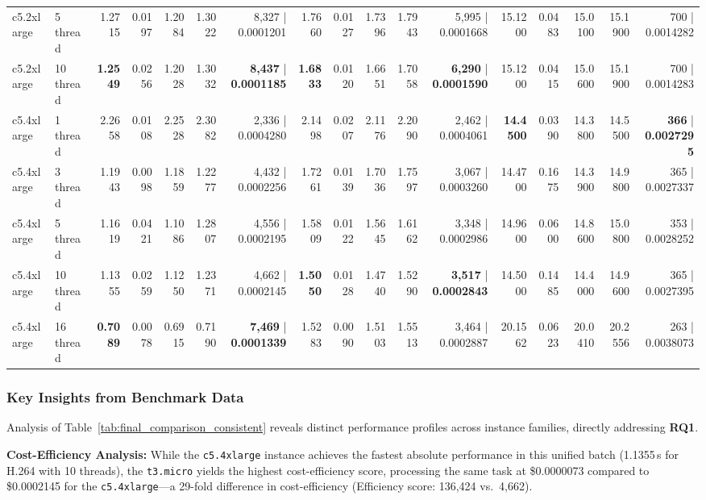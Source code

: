 \documentclass[conference]{IEEEtran}
\begin{document}
\begin{table}[h]
{\begin{tabular}{ll|rrrrr|rrrrr|rrrrr}
			c5.2xlarge & 5 thread & 1.2715 & 0.0197 & 1.2084 & 1.3022 & 8,327 | 0.0001201 & 1.7660 & 0.0127 & 1.7396 & 1.7943 & 5,995 | 0.0001668 & 15.1200 & 0.0483 & 15.0100 & 15.1900 & 700 | 0.0014282 \\
			c5.2xlarge & 10 thread & \textbf{1.2549} & 0.0256 & 1.2028 & 1.3032 & \textbf{8,437} | \textbf{0.0001185} & \textbf{1.6833} & 0.0120 & 1.6651 & 1.7058 & \textbf{6,290} | \textbf{0.0001590} & 15.1200 & 0.0415 & 15.0600 & 15.1900 & 700 | 0.0014283 \\
			\midrule
			c5.4xlarge & 1 thread & 2.2658 & 0.0108 & 2.2528 & 2.3082 & 2,336 | 0.0004280 & 2.1498 & 0.0207 & 2.1176 & 2.2090 & 2,462 | 0.0004061 & \textbf{14.4500} & 0.0390 & 14.3800 & 14.5500 & \textbf{366} | \textbf{0.0027295} \\
			c5.4xlarge & 3 thread & 1.1943 & 0.0098 & 1.1859 & 1.2277 & 4,432 | 0.0002256 & 1.7261 & 0.0139 & 1.7036 & 1.7597 & 3,067 | 0.0003260 & 14.4700 & 0.1675 & 14.3900 & 14.9800 & 365 | 0.0027337 \\
			c5.4xlarge & 5 thread & 1.1619 & 0.0421 & 1.1086 & 1.2807 & 4,556 | 0.0002195 & 1.5809 & 0.0122 & 1.5645 & 1.6162 & 3,348 | 0.0002986 & 14.9600 & 0.0600 & 14.8600 & 15.0800 & 353 | 0.0028252 \\
			c5.4xlarge & 10 thread & 1.1355 & 0.0259 & 1.1250 & 1.2371 & 4,662 | 0.0002145 & \textbf{1.5050} & 0.0128 & 1.4740 & 1.5290 & \textbf{3,517} | \textbf{0.0002843} & 14.5000 & 0.1485 & 14.4000 & 14.9600 & 365 | 0.0027395 \\
			c5.4xlarge & 16 thread & \textbf{0.7089} & 0.0078 & 0.6915 & 0.7190 & \textbf{7,469} | \textbf{0.0001339} & 1.5283 & 0.0090 & 1.5103 & 1.5513 & 3,464 | 0.0002887 & 20.1562 & 0.0623 & 20.0410 & 20.2556 & 263 | 0.0038073 \\
			\bottomrule
		\end{tabular}
	}
\end{table}

\subsubsection{Key Insights from Benchmark Data}

Analysis of Table~\ref{tab:final_comparison_consistent} reveals distinct
performance profiles across instance families, directly addressing \textbf{RQ1}.

\textbf{Cost-Efficiency Analysis:} While the \texttt{c5.4xlarge} instance
achieves the fastest absolute performance in this unified batch (1.1355\,s for H.264
with 10 threads), the \texttt{t3.micro} yields the highest cost-efficiency score,
processing the same task at \$0.0000073 compared to \$0.0002145 for the
\texttt{c5.4xlarge}---a 29-fold difference in cost-efficiency (Efficiency
score: 136,424 vs.\ 4,662).
\end{document}
